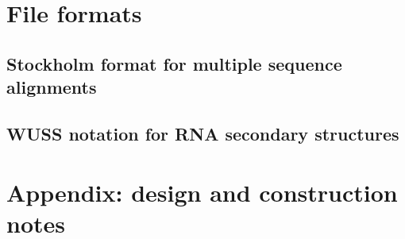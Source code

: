 \documentclass[11pt]{book}
\begin{document}
\newpage
\chapter{File formats}

\section{Stockholm format for multiple sequence alignments}


\newpage
\section{WUSS notation for RNA secondary structures}


\newpage
\chapter{Appendix: design and construction notes}


\newpage
\newcommand{\bibfont}{\footnotesize}


\end{document}

